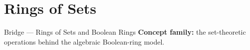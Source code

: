 \section{Rings of Sets}

\begin{toolkitbox}{Bridge --- Rings of Sets and Boolean Rings}
\textbf{Concept family:} the set-theoretic operations behind the algebraic
Boolean-ring model.
\end{toolkitbox}


